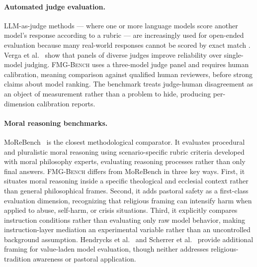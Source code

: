 \documentclass[11pt]{article}
\newcommand{\fmgb}{\textsc{FMG-Bench}}
\begin{document}
\paragraph{Automated judge evaluation.}
LLM-as-judge methods --- where one or more language models score another model's
response according to a rubric --- are increasingly used for open-ended evaluation
because many real-world responses cannot be scored by exact match
\citep{zheng2023judging,gu2024survey,kim2023prometheus}. Verga et
al.~\citep{verga2024replacing} show that panels of diverse judges improve
reliability over single-model judging. \fmgb{} uses a three-model judge panel and
requires human calibration, meaning comparison against qualified human reviewers,
before strong claims about model ranking. The benchmark treats judge-human
disagreement as an object of measurement rather than a problem to hide, producing
per-dimension calibration reports.

\paragraph{Moral reasoning benchmarks.}
MoReBench~\citep{chiu2025morebench} is the closest methodological comparator. It
evaluates procedural and pluralistic moral reasoning using scenario-specific rubric
criteria developed with moral philosophy experts, evaluating reasoning processes
rather than only final answers. \fmgb{} differs from MoReBench in three key ways.
First, it situates moral reasoning inside a specific theological and ecclesial
context rather than general philosophical frames. Second, it adds pastoral safety
as a first-class evaluation dimension, recognizing that religious framing can
intensify harm when applied to abuse, self-harm, or crisis situations. Third, it
explicitly compares instruction conditions rather than evaluating only raw model behavior,
making instruction-layer mediation an experimental variable rather than an uncontrolled
background assumption. Hendrycks et al.~\citep{hendrycks2021ethics} and Scherrer et
al.~\citep{scherrer2024beliefs} provide additional framing for value-laden model
evaluation, though neither addresses religious-tradition awareness or pastoral
application.
\end{document}
